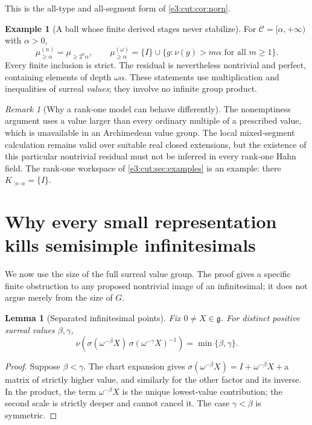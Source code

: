 \documentclass[11pt,letterpaper]{article}
\numberwithin{equation}{section}
\newtheorem{lemma}[lemma]{Lemma}
\theoremstyle{definition}
\newtheorem{example}[example]{Example}
\theoremstyle{remark}
\newtheorem{remark}[remark]{Remark}
\begin{document}
This is the all-type and all-segment form of \cref{e3:cut:cor:norn}.

\begin{example}[A ball whose finite derived stages never stabilize]\label{e3:cpt:ex:ball}
For $\mathcal C=[\alpha,+\infty)$ with $\alpha>0$,
\[
 \mu_{\ge\alpha}^{(n)}=\mu_{\ge2^n\alpha},\qquad
 \mu_{\ge\alpha}^{(\omega)}
 =\{I\}\cup\{g:\nu(g)>m\alpha\text{ for all }m\ge1\}.
\]
Every finite inclusion is strict. The residual is nevertheless nontrivial and
perfect, containing elements of depth $\omega\alpha$. These statements use
multiplication and inequalities of surreal \emph{values}; they involve no
infinite group product.
\end{example}

\begin{remark}[Why a rank-one model can behave differently]\label{e3:cpt:rem:rankone}
The nonemptiness argument uses a value larger than every ordinary multiple of a
prescribed value, which is unavailable in an Archimedean value group. The local
mixed-segment calculation remains valid over suitable real closed extensions,
but the existence of this particular nontrivial residual must not be inferred in
every rank-one Hahn field. The rank-one workspace of \cref{e3:cut:sec:examples}
is an example: there $K_{\gg\alpha}=\{I\}$.
\end{remark}

\section{Why every small representation kills semisimple infinitesimals}\label{e3:cpt:sec:small}

We now use the size of the full surreal value group. The proof gives a specific
finite obstruction to any proposed nontrivial image of an infinitesimal; it
does not argue merely from the size of $G$.

\begin{lemma}[Separated infinitesimal points]\label{e3:cpt:lem:separated}
Fix $0\ne X\in\mathfrak g$. For distinct positive surreal values
$\beta,\gamma$,
\[
 \nu\!\left(\sigma(\omega^{-\beta}X)\,\sigma(\omega^{-\gamma}X)^{-1}\right)
 =\min\{\beta,\gamma\}.
\]
\end{lemma}
\begin{proof}
Suppose $\beta<\gamma$. The chart expansion gives
$\sigma(\omega^{-\beta}X)=I+\omega^{-\beta}X+{}$a matrix of strictly higher
value, and similarly for the other factor and its inverse. In the product, the
term $\omega^{-\beta}X$ is the unique lowest-value contribution; the second
scale is strictly deeper and cannot cancel it. The case $\gamma<\beta$ is
symmetric.
\end{proof}
\end{document}
